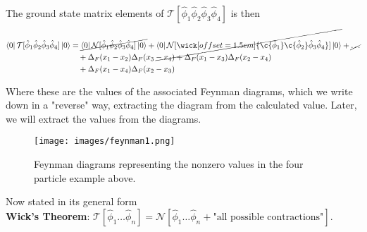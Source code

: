 \noindent The ground state matrix elements of $\mathcal{T}[\hat{\phi}_1 \hat{\phi}_2 \hat{\phi}_3 \hat{\phi}_4]$ is then
\begin{align*}
\bra{0} \mathcal{T}[\hat{\phi}_1 \hat{\phi}_2 \hat{\phi}_3 \hat{\phi}_4] \ket{0} &= \cancel{\bra{0} \mathcal{N}[\hat{\phi}_1 \hat{\phi}_2 \hat{\phi}_3 \hat{\phi}_4] \ket{0}} + \cancel{\bra{0} \mathcal{N}[\wick[offset=1.5em]{\c {\hat{\phi}_1} \c {\hat{\phi}_2} \hat{\phi}_3 \hat{\phi}_4}] \ket{0}} + \cancel{\dots} \\
&\,\,\,\,\,\, + \Delta_F(x_1-x_2)\Delta_F(x_3-x_4) + \Delta_F(x_1-x_3)\Delta_F(x_2-x_4) \\
&\,\,\,\,\,\, + \Delta_F(x_1-x_4)\Delta_F(x_2-x_3)
\end{align*}

\noindent Where these are the values of the associated Feynman diagrams, which we write down in a "reverse" way, extracting the diagram from the calculated value. Later, we will extract the values from the diagrams.

\begin{figure}[H]
	\centering
	\texttt{[image: images/feynman1.png]}
	\caption{Feynman diagrams representing the nonzero values in the four particle example above.}
\end{figure}

\noindent Now stated in its general form \\

\noindent \textbf{Wick's Theorem}: $\mathcal{T}[\hat{\phi}_1 \dots \hat{\phi}_n] = \mathcal{N}[\hat{\phi}_1 \dots \hat{\phi}_n + \text{"all possible contractions"}]$. \\

